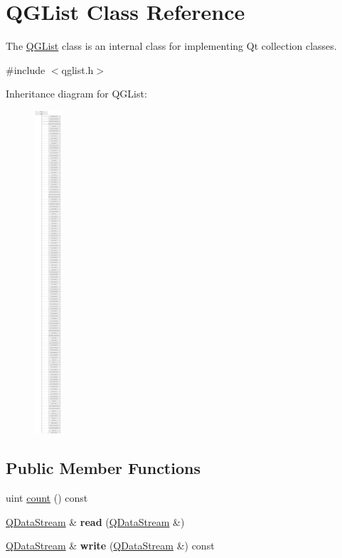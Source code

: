\hypertarget{class_q_g_list}{}\section{Q\+G\+List Class Reference}
\label{class_q_g_list}


The \mbox{\hyperlink{class_q_g_list}{Q\+G\+List}} class is an internal class for implementing Qt collection classes.  




{\ttfamily \#include $<$qglist.\+h$>$}

Inheritance diagram for Q\+G\+List\+:\begin{figure}[H]
\begin{center}
\leavevmode
\includegraphics[height=12.000000cm]{class_q_g_list}
\end{center}
\end{figure}
\subsection*{Public Member Functions}
\begin{DoxyCompactItemize}
\item 
uint \mbox{\hyperlink{class_q_g_list_af765260057e85e575adff7fd9f25d062}{count}} () const
\item 
\mbox{\label{class_q_g_list_a92e5a02569162c5951a90bca606223a2}} 
\mbox{\hyperlink{class_q_data_stream}{Q\+Data\+Stream}} \& {\bfseries read} (\mbox{\hyperlink{class_q_data_stream}{Q\+Data\+Stream}} \&)
\item 
\mbox{\label{class_q_g_list_ae522fc8c2df7736e847d93e561daffae}} 
\mbox{\hyperlink{class_q_data_stream}{Q\+Data\+Stream}} \& {\bfseries write} (\mbox{\hyperlink{class_q_data_stream}{Q\+Data\+Stream}} \&) const
\end{DoxyCompactItemize}
